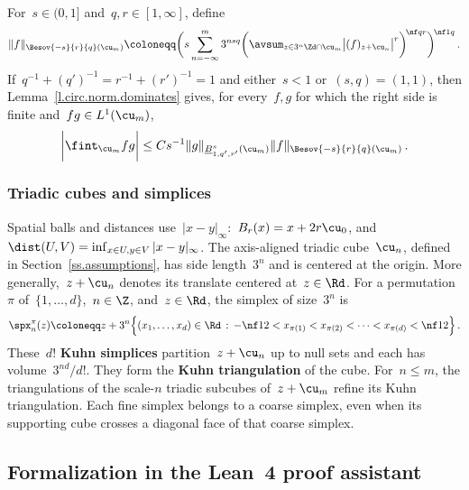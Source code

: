 \documentclass[11pt]{amsart}
\begin{document}
\smallskip

For~$s\in(0,1]$ and~$q,r\in[1,\infty]$, define
\begin{equation}
	\| f \|_{\Besov{-s}{r}{q}(\cu_m)}
	\coloneqq
	\biggl(
	s\sum_{n=-\infty}^m
	3^{nsq}
	\biggl(
	\avsum_{z\in 3^{n} \Zd \cap \cu_m}
	\bigl| (f)_{z+\cu_n} \bigr|^r
	\biggr)^{\!\nf qr} \biggr)^{\!\nf1q} \,.
	\label{e.Besov.weaknorm.def}
\end{equation}
If~$q^{-1}+(q')^{-1}=r^{-1}+(r')^{-1}=1$ and either~$s<1$ or~$(s,q)=(1,1)$, then Lemma~\ref{l.circ.norm.dominates} gives, for every~$f,g$ for which the right side is finite and~$fg\in L^1(\cu_m)$,
\begin{equation}
	\biggl| \fint_{\cu_m} f g \biggr|
	\leq
	C s^{-1}  \| g \|_{\underline{B}^{s}_{1,q',r'}(\cu_m)}
	\| f \|_{\Besov{-s}{r}{q}(\cu_m)}\,.
	\label{e.duality.splitting}
\end{equation}

\subsubsection*{Triadic cubes and simplices}
Spatial balls and distances use~$|x-y|_\infty$:~$B_r(x)=x+2r\cu_0$, and~$\dist(U,V)=\inf_{x\in U,y\in V}|x-y|_\infty$. The axis-aligned triadic cube~$\cu_n$, defined in Section~\ref{ss.assumptions}, has side length~$3^n$ and is centered at the origin. More generally,~$z+\cu_n$ denotes its translate centered at~$z\in\Rd$. For a permutation~$\pi$ of~$\{1,\ldots,d\}$,~$n\in\Z$, and~$z\in\Rd$, the simplex of size~$3^n$ is
\begin{equation*}
	\spx_n^\pi(z)  \coloneqq  z + 3^n  \Bigl\{ (x_1,\ldots,x_d) \in\Rd \,:\, -\nf12 < x_{\pi(1)} < x_{\pi(2)} < \cdots < x_{\pi(d)} < \nf12  \Bigr\}
	\,.
\end{equation*}
These~$d!$ \textbf{Kuhn simplices} partition~$z+\cu_n$ up to null sets and each has volume~$3^{nd}/d!$. They form the \textbf{Kuhn triangulation} of the cube. For~$n\leq m$, the triangulations of the scale-$n$ triadic subcubes of~$z+\cu_m$ refine its Kuhn triangulation. Each fine simplex belongs to a coarse simplex, even when its supporting cube crosses a diagonal face of that coarse simplex.

\endgroup

\subsection{Formalization in the Lean~4 proof assistant}
\label{ss.formalization}
\end{document}
